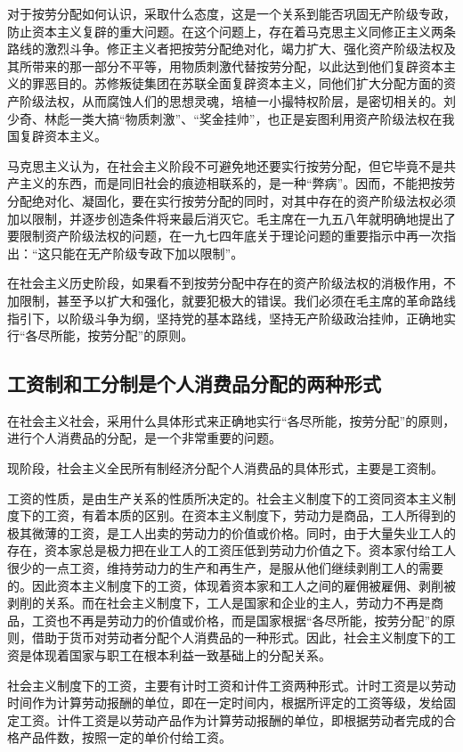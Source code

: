 \documentclass{book}
\begin{document}
对于按劳分配如何认识，采取什么态度，这是一个关系到能否巩固无产阶级专政，防止资本主义复辟的重大问题。在这个问题上，存在着马克思主义同修正主义两条路线的激烈斗争。修正主义者把按劳分配绝对化，竭力扩大、强化资产阶级法权及其所带来的那一部分不平等，用物质刺激代替按劳分配，以此达到他们复辟资本主义的罪恶目的。苏修叛徒集团在苏联全面复辟资本主义，同他们扩大分配方面的资产阶级法权，从而腐蚀人们的思想灵魂，培植一小撮特权阶层，是密切相关的。刘少奇、林彪一类大搞“物质刺激”、“奖金挂帅”，也正是妄图利用资产阶级法权在我国复辟资本主义。

马克思主义认为，在社会主义阶段不可避免地还要实行按劳分配，但它毕竟不是共产主义的东西，而是同旧社会的痕迹相联系的，是一种“弊病”。因而，不能把按劳分配绝对化、凝固化，要在实行按劳分配的同时，对其中存在的资产阶级法权必须加以限制，并逐步创造条件将来最后消灭它。毛主席在一九五八年就明确地提出了要限制资产阶级法权的问题，在一九七四年底关于理论问题的重要指示中再一次指出：“这只能在无产阶级专政下加以限制”。

在社会主义历史阶段，如果看不到按劳分配中存在的资产阶级法权的消极作用，不加限制，甚至予以扩大和强化，就要犯极大的错误。我们必须在毛主席的革命路线指引下，以阶级斗争为纲，坚持党的基本路线，坚持无产阶级政治挂帅，正确地实行“各尽所能，按劳分配”的原则。

\subsection{工资制和工分制是个人消费品分配的两种形式}

在社会主义社会，采用什么具体形式来正确地实行“各尽所能，按劳分配”的原则，进行个人消费品的分配，是一个非常重要的问题。

现阶段，社会主义全民所有制经济分配个人消费品的具体形式，主要是工资制。

工资的性质，是由生产关系的性质所决定的。社会主义制度下的工资同资本主义制度下的工资，有着本质的区别。在资本主义制度下，劳动力是商品，工人所得到的极其微薄的工资，是工人出卖的劳动力的价值或价格。同时，由于大量失业工人的存在，资本家总是极力把在业工人的工资压低到劳动力价值之下。资本家付给工人很少的一点工资，维持劳动力的生产和再生产，是服从他们继续剥削工人的需要的。因此资本主义制度下的工资，体现着资本家和工人之间的雇佣被雇佣、剥削被剥削的关系。而在社会主义制度下，工人是国家和企业的主人，劳动力不再是商品，工资也不再是劳动力的价值或价格，而是国家根据“各尽所能，按劳分配”的原则，借助于货币对劳动者分配个人消费品的一种形式。因此，社会主义制度下的工资是体现着国家与职工在根本利益一致基础上的分配关系。

社会主义制度下的工资，主要有计时工资和计件工资两种形式。计时工资是以劳动时间作为计算劳动报酬的单位，即在一定时间内，根据所评定的工资等级，发给固定工资。计件工资是以劳动产品作为计算劳动报酬的单位，即根据劳动者完成的合格产品件数，按照一定的单价付给工资。
\end{document}
